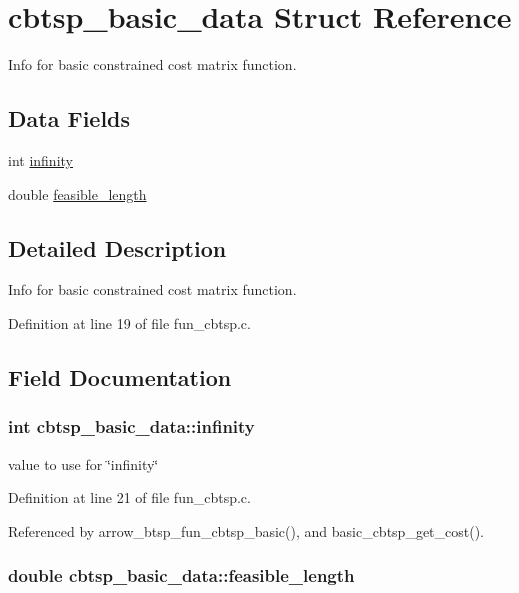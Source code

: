 \hypertarget{structcbtsp__basic__data}{
\section{cbtsp\_\-basic\_\-data Struct Reference}
\label{structcbtsp__basic__data}
}
Info for basic constrained cost matrix function.  


\subsection*{Data Fields}
\begin{CompactItemize}
\item 
int \hyperlink{structcbtsp__basic__data_069c4745b949c50b3645b26ea792af06}{infinity}
\item 
double \hyperlink{structcbtsp__basic__data_149e46676dc1a2310256df3cf097659c}{feasible\_\-length}
\end{CompactItemize}


\subsection{Detailed Description}
Info for basic constrained cost matrix function. 

Definition at line 19 of file fun\_\-cbtsp.c.

\subsection{Field Documentation}
\hypertarget{structcbtsp__basic__data_069c4745b949c50b3645b26ea792af06}{
\subsubsection{\setlength{\rightskip}{0pt plus 5cm}int {\bf cbtsp\_\-basic\_\-data::infinity}}}
\label{structcbtsp__basic__data_069c4745b949c50b3645b26ea792af06}


value to use for \char`\"{}infinity\char`\"{} 

Definition at line 21 of file fun\_\-cbtsp.c.

Referenced by arrow\_\-btsp\_\-fun\_\-cbtsp\_\-basic(), and basic\_\-cbtsp\_\-get\_\-cost().\hypertarget{structcbtsp__basic__data_149e46676dc1a2310256df3cf097659c}{
\subsubsection{\setlength{\rightskip}{0pt plus 5cm}double {\bf cbtsp\_\-basic\_\-data::feasible\_\-length}}}
\label{structcbtsp__basic__data_149e46676dc1a2310256df3cf097659c}


